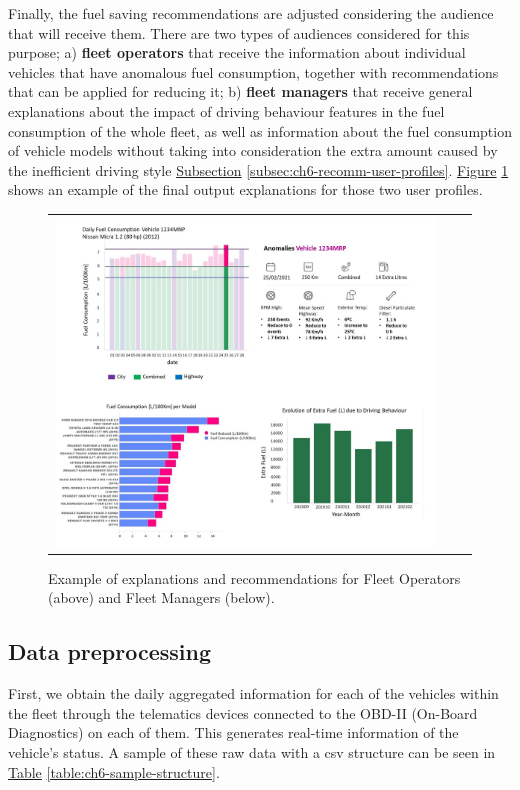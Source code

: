 Finally, the fuel saving recommendations are adjusted considering the audience that will receive them. There are two types of audiences considered for this purpose; a) \textbf{fleet operators} that receive the information about individual vehicles that have anomalous fuel consumption, together with recommendations that can be applied for reducing it; b) \textbf{fleet managers} that receive general explanations about the impact of driving behaviour features in the fuel consumption of the whole fleet, as well as information about the fuel consumption of vehicle models without taking into consideration the extra amount caused by the inefficient driving style \hyperref[subsec:ch6-recomm-user-profiles]{Subsection} \ref{subsec:ch6-recomm-user-profiles}. \hyperref[fig:ch6-ExplanationsDashboardExample]{Figure} \ref{fig:ch6-ExplanationsDashboardExample} shows an example of the final output explanations for those two user profiles. 

\begin{figure}
\centering
  \begin{tabular}{c@{\qquad}c@{\qquad}c}
  \includegraphics[width=0.9\columnwidth]{figures/chapter6_LucaFleet/ExplanationsDashboardExample.jpg}
  \end{tabular} 
  \caption{Example of explanations and recommendations for Fleet Operators (above) and Fleet Managers (below).\label{fig:ch6-ExplanationsDashboardExample}}
\end{figure}

\subsection{Data preprocessing}\label{subsec:ch6-data-processing}
First, we obtain the daily aggregated information for each of the vehicles within the fleet through the telematics devices connected to the OBD-II (On-Board Diagnostics) on each of them. This generates real-time information of the vehicle's status. A sample of these raw data with a csv structure can be seen in \hyperref[table:ch6-sample-structure]{Table} \ref{table:ch6-sample-structure}.


